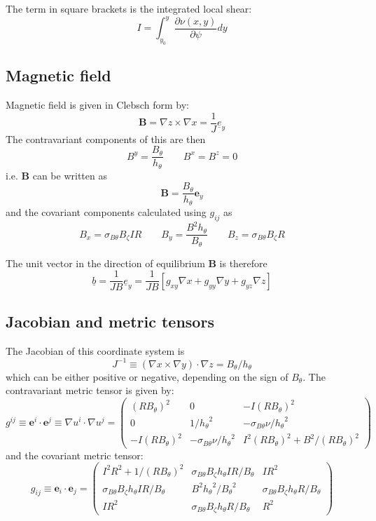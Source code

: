 \documentclass[12pt]{article}
\newcommand{\sbt}{\ensuremath{\sigma_{B\theta}}}
\newcommand{\hthe}{\ensuremath{h_\theta}}
\newcommand{\Bp}{\ensuremath{B_\theta}}
\newcommand{\Bt}{\ensuremath{B_\zeta}}
\newcommand{\Vec}[1]{\ensuremath{\mathbf{#1}}}
\newcommand{\Bvec}{\Vec{B}}
\newcommand{\rbp}{\ensuremath{R\Bp}}
\newcommand{\rbpsq}{\ensuremath{\left(\rbp\right)^2}}
\begin{document}
The term in square brackets is the integrated local shear:
\[
I = \int_{y_0}^y\frac{\partial\nu\left(x, y\right)}{\partial\psi}dy
\]

\subsection{Magnetic field}

Magnetic field is given in Clebsch form by:
\[
\mathbf{B} = \nabla z\times \nabla x = \frac{1}{J}\underline{e}_y
\]
The contravariant components of this are then
\begin{equation}
B^y = \frac{\Bp}{\hthe} \qquad B^x = B^z = 0
\label{eq:B_contravariant}
\end{equation}
i.e. $\Bvec$ can be written as
\begin{equation}
\Bvec = \frac{\Bp}{\hthe}\mathbf{e}_y
\label{eq:Bvec_cont}
\end{equation}
and the covariant components calculated using $g_{ij}$ as
\begin{equation}
B_x = \sbt\Bt I R \qquad B_y = \frac{B^2 \hthe}{\Bp} \qquad B_z = \sbt\Bt R
\label{eq:B_covariant}
\end{equation}

The unit vector in the direction of equilibrium $\Bvec$ is therefore
\[
\underline{b} = \frac{1}{JB}\underline{e}_y = \frac{1}{JB}\left[g_{xy}\nabla x + g_{yy}\nabla y + g_{yz}\nabla z\right]
\]

\subsection{Jacobian and metric tensors}

The Jacobian of this coordinate system is
\[
J^{-1} \equiv \left(\nabla x\times\nabla y\right)\cdot\nabla z = \Bp / \hthe
\]
which can be either positive or negative, depending on the sign of $\Bp$.
The contravariant metric tensor is given by:
\[
g^{ij} \equiv \Vec{e}^i \cdot\Vec{e}^j \equiv \nabla u^i \cdot \nabla u^j = \left(\begin{array}{ccc}
\left(R\Bp\right)^2 & 0 & -I\left(R\Bp\right)^2 \\
0 & 1 / \hthe^2 & -\sbt\nu / \hthe^2 \\
-I\left(R\Bp\right)^2 & -\sbt\nu / \hthe^2 & I^2\left(R\Bp\right)^2 + B^2 / \left(R\Bp\right)^2 \end{array} \right)
\]
and the covariant metric tensor:
\[
g_{ij} \equiv \Vec{e}_i \cdot\Vec{e}_j = \left(\begin{array}{ccc}
I^2 R^2 + 1 / \rbpsq & \sbt\Bt\hthe I R / \Bp & I R^2 \\
\sbt\Bt\hthe I R / \Bp & B^2\hthe^2 / \Bp^2 & \sbt\Bt\hthe R / \Bp \\
I R^2 & \sbt\Bt\hthe R / \Bp & R^2 \end{array} \right)
\]
\end{document}
